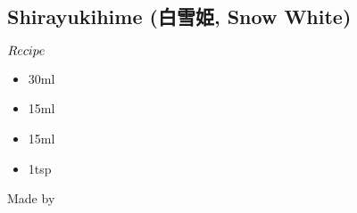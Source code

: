 \subsection{Shirayukihime (白雪姫, Snow White)}
\begin{itembox}[l]{\boldmath $Recipe$}
\begin{itemize}
\setlength{\parskip}{0cm}
\setlength{\itemsep}{0cm}
\item \sake 30ml
\item \yl 15ml
\item \lj 15ml
\item \gumsyrup 1tsp
\end{itemize}
\vspace{-4mm}
Made by \shake
\end{itembox}
